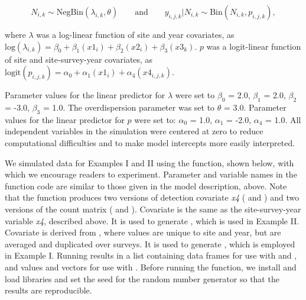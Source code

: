 \documentclass[codesnippet]{jss}
\begin{document}
$$N_{i,k} \sim \text{NegBin}(\lambda_{i,k}, \theta) \qquad \text{and} \qquad  y_{i,j,k} | N_{i,k} \sim \text{Bin}(N_{i,k}, p_{i,j,k}),$$

where $\lambda$ was a log-linear function of site and year covariates, as $\text{log}(\lambda_{i,k}) = \beta_0 + \beta_1 (\textit{x1}_{i}) + \beta_2 (\textit{x2}_{i}) + \beta_3 (\textit{x3}_{k})$. $p$ was a logit-linear function of site and site-survey-year covariates, as $\text{logit}(p_{i,j,k}) = \alpha_0 + \alpha_1 (\textit{x1}_{i}) + \alpha_4 (\textit{x4}_{i,j,k})$.

Parameter values for the linear predictor for $\lambda$ were set to $\beta_0$ = 2.0, $\beta_1$ = 2.0, $\beta_2$ = -3.0, $\beta_3$ = 1.0. The overdispersion parameter was set to $\theta$ = 3.0. Parameter values for the linear predictor for $p$ were set to: $\alpha_0$ = 1.0, $\alpha_1$ = -2.0, $\alpha_4$ = 1.0. All independent variables in the simulation were centered at zero to reduce computational difficulties and to make model intercepts more easily interpreted.

We simulated data for Examples I and II using the  function, shown below, with which we encourage readers to experiment. Parameter and variable names in the function code are similar to those given in the model description, above. Note that the function produces two versions of detection covariate \textit{x4} ( and ) and two versions of the count matrix ( and ). Covariate  is the same as the site-survey-year variable \textit{x4}, described above. It is used to generate , which is used in Example II. Covariate  is derived from , where values are unique to site and year, but are averaged and duplicated over surveys. It is used to generate , which is employed in Example I. Running  results in a list containing data frames for use with  and , and values and vectors for use with . Before running the function, we install and load libraries and set the seed for the random number generator so that the results are reproducible.
\end{document}
